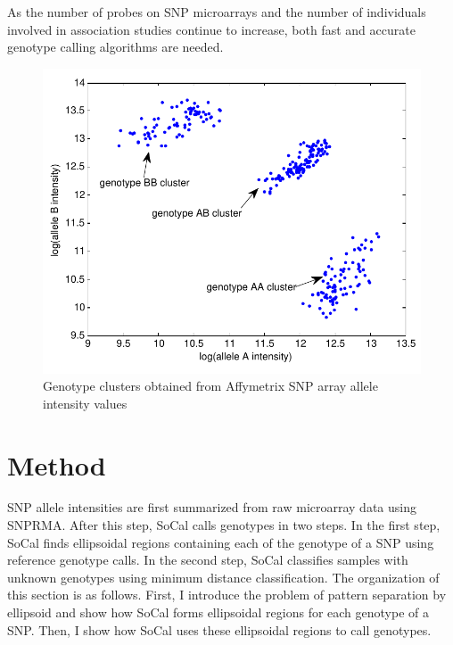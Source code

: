 \documentclass{scrartcl}
\begin{document}
\par
As the number of probes on SNP microarrays and the number of individuals involved
in association studies continue to increase, both fast and accurate genotype
calling algorithms are needed.

\begin{figure}[H]
\centering
\includegraphics[scale=0.75]{intro_figs/intro_genotype_clusters.pdf}
\caption{Genotype clusters obtained from Affymetrix SNP array
allele intensity values}
\label{fig:intro_genclus}
\end{figure}










\section{Method}

\par
SNP allele intensities are first summarized from raw microarray data using
SNPRMA.
After this step, SoCal calls genotypes in two steps.
In the first step, SoCal finds ellipsoidal regions containing each of the
genotype of a SNP using reference genotype calls.
In the second step, SoCal classifies samples with unknown genotypes using
minimum distance classification.
The organization of this section is as follows.
First, I introduce the problem of pattern separation by ellipsoid and show
how SoCal forms ellipsoidal regions for each genotype of a SNP.
Then, I show how SoCal uses these ellipsoidal regions to call genotypes.
\end{document}
